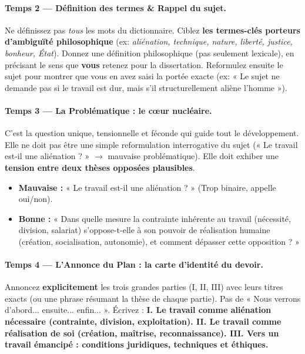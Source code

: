 \documentclass[11pt]{article}
\newcommand{\cle}[1]{{\popxbold\color{popdark}#1}}
\begin{document}
\paragraph{Temps 2 — Définition des termes \& Rappel du sujet.}
Ne définissez pas \emph{tous} les mots du dictionnaire. Ciblez \textbf{les termes-clés porteurs d'ambiguïté philosophique} (ex: \textit{aliénation, technique, nature, liberté, justice, bonheur, État}). Donnez une définition \cle{philosophique} (pas seulement lexicale), en précisant le sens que \textbf{vous} retenez pour la dissertation. Reformulez ensuite le sujet pour montrer que vous en avez saisi la portée exacte (ex: « Le sujet ne demande pas si le travail est dur, mais s'il structurellement aliène l'homme »).

\paragraph{Temps 3 — La Problématique : le cœur nucléaire.}
C'est la \cle{question unique, tensionnelle et féconde} qui guide tout le développement. Elle ne doit pas être une simple reformulation interrogative du sujet (« Le travail est-il une aliénation ? » $\to$ mauvaise problématique). Elle doit exhiber une \textbf{tension entre deux thèses opposées plausibles}.
\begin{itemize}
    \item \textbf{Mauvaise :} « Le travail est-il une aliénation ? » (Trop binaire, appelle oui/non).
    \item \textbf{Bonne :} « Dans quelle mesure la contrainte inhérente au travail (nécessité, division, salariat) s'oppose-t-elle à son pouvoir de réalisation humaine (création, socialisation, autonomie), et comment dépasser cette opposition ? »
\end{itemize}

\paragraph{Temps 4 — L'Annonce du Plan : la carte d'identité du devoir.}
Annoncez \textbf{explicitement} les trois grandes parties (I, II, III) avec leurs titres exacts (ou une phrase résumant la thèse de chaque partie). Pas de « Nous verrons d'abord... ensuite... enfin... ». Écrivez : \textbf{I. Le travail comme aliénation nécessaire (contrainte, division, exploitation). II. Le travail comme réalisation de soi (création, maîtrise, reconnaissance). III. Vers un travail émancipé : conditions juridiques, techniques et éthiques.}
\end{document}
